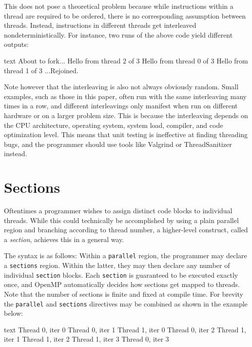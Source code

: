 \documentclass[conference, a4paper]{IEEEtran-modified}
\begin{document}
    This does not pose a theoretical problem because while instructions within a thread are required to be ordered, there is no corresponding assumption between threads. Instead, instructions in different threads get interleaved nondeterministically. For instance, two runs of the above code yield different outputs:

\begin{multicols}{2}

      \begin{ccode}[]
        {text}
        About to fork...
        Hello from thread 2 of 3
        Hello from thread 0 of 3
        Hello from thread 1 of 3
        ...Rejoined.\end{ccode}
\end{multicols}

    Note however that the interleaving is also not always obviously random. Small examples, such as those in this paper, often run with the same interleaving many times in a row, and different interleavings only manifest when run on different hardware or on a larger problem size. This is because the interleaving depends on the CPU architecture, operating system, system load, compiler, and code optimization level. This means that unit testing is ineffective at finding threading bugs, and the programmer should use tools like Valgrind or ThreadSanitizer instead. 


\section{Sections}


Oftentimes a programmer wishes to assign distinct code blocks to individual threads. While this could technically be accomplished by using a plain parallel region and branching according to thread number, a higher-level construct, called a \emph{section}, achieves this in a general way. 

The syntax is as follows: Within a \texttt{parallel} region, the programmer may declare a \texttt{sections} region. Within the latter, they may then declare any number of individual \texttt{section} blocks. Each \texttt{section} is guaranteed to be executed exactly once, and OpenMP automatically decides how sections get mapped to threads. Note that the number of sections is finite and fixed at compile time. For brevity the \texttt{parallel} and \texttt{sections} directives may be combined as shown in the example below: 

      \begin{multicols}{2}

      \begin{ccode}[]
        {text}
        Thread 0, iter 0
        Thread 0, iter 1
          Thread 1, iter 0
        Thread 0, iter 2
          Thread 1, iter 1
          Thread 1, iter 2
          Thread 1, iter 3
        Thread 0, iter 3\end{ccode}
\end{multicols}
\end{document}
